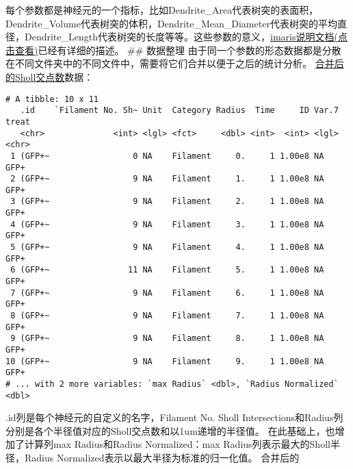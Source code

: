 \documentclass[]{article}
\begin{document}
每个参数都是神经元的一个指标，比如Dendrite\_Area代表树突的表面积，Dendrite\_Volume代表树突的体积，Dendrite\_Mean\_Diameter代表树突的平均直径，Dendrite\_Length代表树突的长度等等。这些参数的意义，\href{filament_statistics_preferences.html}{imaris说明文档(点击查看)}已经有详细的描述。
\#\# 数据整理
由于同一个参数的形态数据都是分散在不同文件夹中的不同文件中，需要将它们合并以便于之后的统计分析。
\href{Sum\%20of\%20Filament_No._Sholl_Intersections\%20.csv}{合并后的Sholl交点数}数据：

\begin{verbatim}
# A tibble: 10 x 11
   .id    `Filament No. Sh~ Unit  Category Radius  Time     ID Var.7 treat
   <chr>              <int> <lgl> <fct>     <dbl> <int>  <int> <lgl> <chr>
 1 (GFP+~                 0 NA    Filament     0.     1 1.00e8 NA    GFP+ 
 2 (GFP+~                 9 NA    Filament     1.     1 1.00e8 NA    GFP+ 
 3 (GFP+~                 9 NA    Filament     2.     1 1.00e8 NA    GFP+ 
 4 (GFP+~                 9 NA    Filament     3.     1 1.00e8 NA    GFP+ 
 5 (GFP+~                 9 NA    Filament     4.     1 1.00e8 NA    GFP+ 
 6 (GFP+~                11 NA    Filament     5.     1 1.00e8 NA    GFP+ 
 7 (GFP+~                 9 NA    Filament     6.     1 1.00e8 NA    GFP+ 
 8 (GFP+~                 9 NA    Filament     7.     1 1.00e8 NA    GFP+ 
 9 (GFP+~                 9 NA    Filament     8.     1 1.00e8 NA    GFP+ 
10 (GFP+~                 9 NA    Filament     9.     1 1.00e8 NA    GFP+ 
# ... with 2 more variables: `max Radius` <dbl>, `Radius Normalized` <dbl>
\end{verbatim}

.id列是每个神经元的自定义的名字，Filament No. Sholl
Intersections和Radius列分别是各个半径值对应的Sholl交点数和以1um递增的半径值。
在此基础上，也增加了计算列max Radius和Radius Normalized：max
Radius列表示最大的Sholl半径，Radius
Normalized表示以最大半径为标准的归一化值。 合并后的
\end{document}
